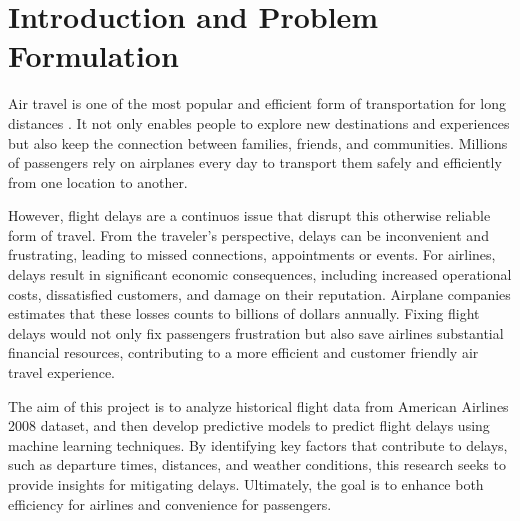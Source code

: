 \section{Introduction and Problem Formulation}
Air travel is one of the most popular and efficient form of transportation for long distances \cite{BTS2011}. 
It not only enables people to explore new destinations and experiences but also keep the connection between families, friends, and communities.
Millions of passengers rely on airplanes every day to transport them safely and efficiently from one location to another.
\par
However, flight delays are a continuos issue that disrupt this otherwise reliable form of travel. 
From the traveler’s perspective, delays can be inconvenient and frustrating, leading to missed connections, appointments or events. 
For airlines, delays result in significant economic consequences, including increased operational costs, dissatisfied customers, and damage on their reputation.
Airplane companies estimates that these losses counts to billions of dollars annually. 
Fixing flight delays would not only fix passengers frustration but also save airlines substantial financial resources, contributing to a more efficient and customer friendly air travel experience.
\par
The aim of this project is to analyze historical flight data from American Airlines 2008 dataset, and then develop predictive models to predict flight delays using machine learning techniques.
By identifying key factors that contribute to delays, such as departure times, distances, and weather conditions, this research seeks to provide insights for mitigating delays. 
Ultimately, the goal is to enhance both efficiency for airlines and convenience for passengers.
